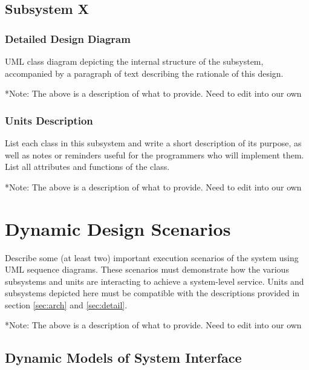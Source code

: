 \documentclass[12pt]{article}
\begin{document}
\begin{table}[H]
\begin{center}
{\begin{tabular}{|l|p{0.8\linewidth}|}
\end{tabular}}
\end{center}
\end{table}

\clearpage

\subsection{Subsystem X}

\subsubsection{Detailed Design Diagram}

UML class diagram depicting the internal structure of the subsystem,
accompanied by a paragraph of text describing the rationale of this design.

*Note: The above is a description of what to provide. Need to edit into our own




\subsubsection{Units Description}

List each class in this subsystem and write a short description of its purpose,
as well as notes or reminders useful for the programmers who will implement them.
List all attributes and functions of the class.

*Note: The above is a description of what to provide. Need to edit into our own

\section{Dynamic Design Scenarios} \label{Dynamic Models}

Describe some (at least two) important execution scenarios of the system using UML sequence diagrams.
These scenarios must demonstrate how the various subsystems and units are interacting to achieve a system-level service.
Units and subsystems depicted here must be compatible with the descriptions provided in
section \ref{sec:arch} and \ref{sec:detail}.

*Note: The above is a description of what to provide. Need to edit into our own


\subsection{Dynamic Models of System Interface}
\end{document}
